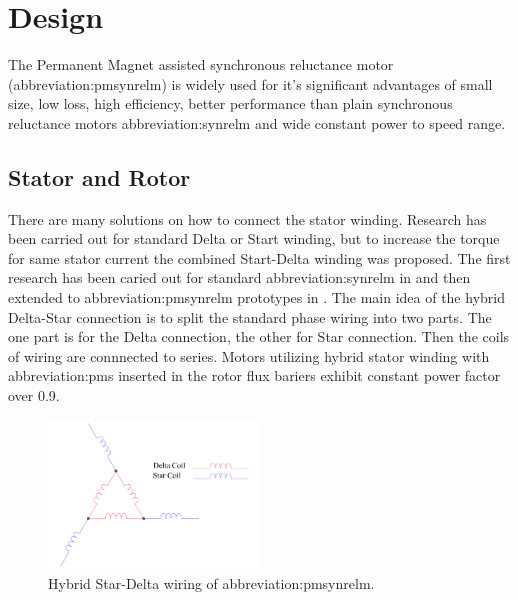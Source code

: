\documentclass[a4paper, twoside, 11pt]{article}
\begin{document}
\section{Design}
The Permanent Magnet assisted synchronous reluctance motor (\gls{abbreviation:pmsynrelm}) is widely used for it's significant advantages of small size, low loss, high efficiency, better performance than plain synchronous reluctance motors \gls{abbreviation:synrelm} and wide constant power to speed range. \cite{xinmin-design-of-permanent-magnet-assisted-synch-rel-m-with-low-torque-ripple,huynh-design-and-analysis-of-perm-as-synch-rel-m}
    \subsection{Stator and Rotor}
        There are many solutions on how to connect the stator winding. Research has been carried out for standard Delta or Start winding, but to increase the torque for same stator current the combined Start-Delta winding was proposed. The first research has been caried out for standard \gls{abbreviation:synrelm} in \cite{ibrahim-an-improved-torque-density-synchronous-reluctance-machine-with-a-combined-star-delta-winding-layout} and then extended to \gls{abbreviation:pmsynrelm} prototypes in \cite{ibrahim-permanent-magnet-assisted-synchronous-reluctance-motor-employing-a-hybrid-star-delta-winding-for-high-speed-applicaitons}. The main idea of the hybrid Delta-Star connection is to split the standard phase wiring into two parts. The one part is for the Delta connection, the other for Star connection. Then the coils of wiring are connnected to series. Motors utilizing hybrid stator winding with \gls{abbreviation:pm}s inserted in the rotor flux bariers exhibit constant power factor over 0.9. \cite{ibrahim-permanent-magnet-assisted-synchronous-reluctance-motor-employing-a-hybrid-star-delta-winding-for-high-speed-applicaitons}

        \begin{figure}[htbp!]
            \centering
            \includegraphics[width=0.5\textwidth]{src/pdf/hybrid-star-delta-wiring.pdf}
            \caption{Hybrid Star-Delta wiring of \gls{abbreviation:pmsynrelm}.}
            \label{fig:hybrid-star-delta-wiring}
        \end{figure}
\end{document}
